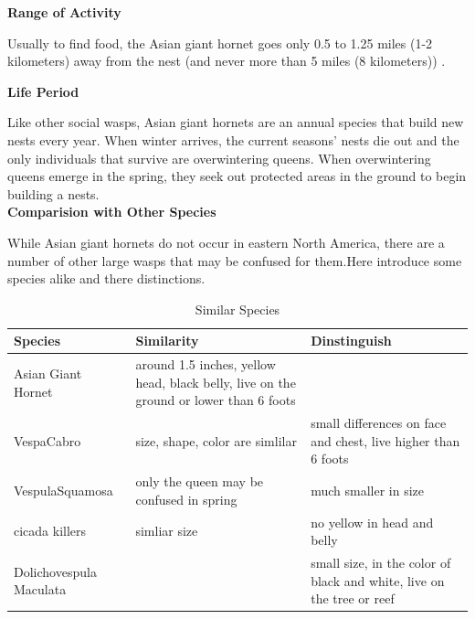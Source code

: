\documentclass[12pt]{article}
\begin{document}
\textbf{Range of Activity }

Usually to find food, the Asian giant hornet goes only 0.5 to 1.25 miles (1-2 kilometers) away from the nest (and never more than 5 miles (8 kilometers)) .

\textbf{Life Period}

 Like other social wasps, Asian giant hornets are an annual species that build new nests every year. When winter arrives, the current seasons' nests die out and the only individuals that survive are overwintering queens. When overwintering queens emerge in the spring, they seek out protected areas in the ground to begin building a nests.
\quad\\
 
\textbf{Comparision with Other Species}

While Asian giant hornets do not occur in eastern North America, there are a number of other large wasps that may be confused for them.Here introduce some species alike and there distinctions.
\begin{table}  
	\caption{Similar Species}  
	\begin{center}  
		\begin{tabular}{|p{5cm}<{\centering}|p{7cm}<{\centering}| p{5cm}<{\centering}|}  
			\hline  
			Species & Similarity & Dinstinguish  \\ \hline  
			Asian Giant Hornet& around 1.5 inches, yellow head, black belly, live on the ground or lower than 6 foots&\\ \hline  
			VespaCabro & size, shape, color are simlilar &small differences on face and chest, live higher than 6 foots \\  
			\hline 
			VespulaSquamosa & only the queen may be confused in spring  &much smaller in size \\  
			\hline  
			cicada killers & simliar size  &no yellow in head and belly \\  
			\hline
			Dolichovespula Maculata &  &small size, in the color of black and white, live on the tree or reef\\  
			\hline
		\end{tabular}  
	\end{center}  
\end{table}
\end{document}
